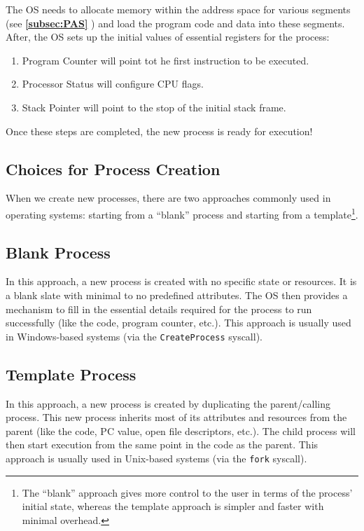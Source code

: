 \documentclass{report}
\newcommand{\refto}[2]{\textbf{\ref{#1:#2} \nameref{#1:#2}}}
\begin{document}
The OS needs to allocate memory within the address space for various segments (see \refto{subsec}{PAS})
and load the program code and data into these segments. After, the OS sets up the initial values of
essential registers for the process:
\begin{enumerate}[label=\textit{(\roman*)}]
\item Program Counter will point tot he first instruction to be executed.
\item Processor Status will configure CPU flags.
\item Stack Pointer will point to the stop of the initial stack frame.
\end{enumerate}
Once these steps are completed, the new process is ready for execution!


\subsection{Choices for Process Creation}
When we create new processes, there are two approaches commonly used in operating systems: starting
from a ``blank'' process and starting from a template\footnote{The ``blank'' approach gives more
  control to the user in terms of the process' initial state, whereas the template approach is
  simpler and faster with minimal overhead.}.


\subsection*{Blank Process}
In this approach, a new process is created with no specific state or resources. It is a blank slate
with minimal to no  predefined attributes. The OS then provides a mechanism to fill in the
essential details required for the process to run successfully (like the code, program counter,
etc.). This approach is usually used in Windows-based systems (via the \texttt{CreateProcess} syscall).


\subsection*{Template Process}
In this approach, a new process is created by duplicating the parent/calling process. This new
process inherits most of its attributes and resources from the parent (like the code, PC value, open
file descriptors, etc.). The child process will then start execution from the same point in the
code as the parent. This approach is usually used in Unix-based systems (via the \texttt{fork}
syscall).
\end{document}
